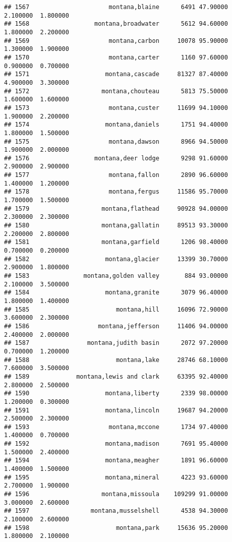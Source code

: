 \documentclass[
]{article}
\begin{document}
\begin{verbatim}
## 1567                      montana,blaine      6491 47.90000  2.100000  1.800000
## 1568                  montana,broadwater      5612 94.60000  1.800000  2.200000
## 1569                      montana,carbon     10078 95.90000  1.300000  1.900000
## 1570                      montana,carter      1160 97.60000  0.900000  0.700000
## 1571                     montana,cascade     81327 87.40000  4.900000  3.300000
## 1572                    montana,chouteau      5813 75.50000  1.600000  1.600000
## 1573                      montana,custer     11699 94.10000  1.900000  2.200000
## 1574                     montana,daniels      1751 94.40000  1.800000  1.500000
## 1575                      montana,dawson      8966 94.50000  1.900000  2.000000
## 1576                  montana,deer lodge      9298 91.60000  2.900000  2.900000
## 1577                      montana,fallon      2890 96.60000  1.400000  1.200000
## 1578                      montana,fergus     11586 95.70000  1.700000  1.500000
## 1579                    montana,flathead     90928 94.00000  2.300000  2.300000
## 1580                    montana,gallatin     89513 93.30000  2.200000  2.800000
## 1581                    montana,garfield      1206 98.40000  0.700000  0.200000
## 1582                     montana,glacier     13399 30.70000  2.900000  1.800000
## 1583               montana,golden valley       884 93.00000  2.100000  3.500000
## 1584                     montana,granite      3079 96.40000  1.800000  1.400000
## 1585                        montana,hill     16096 72.90000  3.600000  2.300000
## 1586                   montana,jefferson     11406 94.00000  2.400000  2.000000
## 1587                montana,judith basin      2072 97.20000  0.700000  1.200000
## 1588                        montana,lake     28746 68.10000  7.600000  3.500000
## 1589             montana,lewis and clark     63395 92.40000  2.800000  2.500000
## 1590                     montana,liberty      2339 98.00000  1.200000  0.300000
## 1591                     montana,lincoln     19687 94.20000  2.500000  2.300000
## 1593                      montana,mccone      1734 97.40000  1.400000  0.700000
## 1592                     montana,madison      7691 95.40000  1.500000  2.400000
## 1594                     montana,meagher      1891 96.60000  1.400000  1.500000
## 1595                     montana,mineral      4223 93.60000  2.700000  1.900000
## 1596                    montana,missoula    109299 91.00000  3.000000  2.600000
## 1597                 montana,musselshell      4538 94.30000  2.100000  2.600000
## 1598                        montana,park     15636 95.20000  1.800000  2.100000

\end{verbatim}
\end{document}
